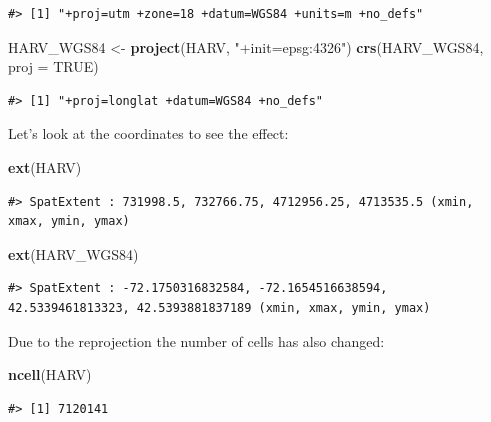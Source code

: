 \documentclass[
]{book}
\newenvironment{Shaded}{\begin{snugshade}}{\end{snugshade}}
\newcommand{\AttributeTok}[1]{\textcolor[rgb]{0.13,0.29,0.53}{#1}}
\newcommand{\ConstantTok}[1]{\textcolor[rgb]{0.56,0.35,0.01}{#1}}
\newcommand{\FunctionTok}[1]{\textcolor[rgb]{0.13,0.29,0.53}{\textbf{#1}}}
\newcommand{\NormalTok}[1]{#1}
\newcommand{\OtherTok}[1]{\textcolor[rgb]{0.56,0.35,0.01}{#1}}
\newcommand{\StringTok}[1]{\textcolor[rgb]{0.31,0.60,0.02}{#1}}
\begin{document}
\begin{verbatim}
#> [1] "+proj=utm +zone=18 +datum=WGS84 +units=m +no_defs"
\end{verbatim}

\begin{Shaded}
\begin{Highlighting}[]
\NormalTok{HARV\_WGS84 }\OtherTok{\textless{}{-}} \FunctionTok{project}\NormalTok{(HARV, }\StringTok{"+init=epsg:4326"}\NormalTok{)}
\FunctionTok{crs}\NormalTok{(HARV\_WGS84, }\AttributeTok{proj =} \ConstantTok{TRUE}\NormalTok{)}
\end{Highlighting}
\end{Shaded}

\begin{verbatim}
#> [1] "+proj=longlat +datum=WGS84 +no_defs"
\end{verbatim}

Let's look at the coordinates to see the effect:

\begin{Shaded}
\begin{Highlighting}[]
\FunctionTok{ext}\NormalTok{(HARV)}
\end{Highlighting}
\end{Shaded}

\begin{verbatim}
#> SpatExtent : 731998.5, 732766.75, 4712956.25, 4713535.5 (xmin, xmax, ymin, ymax)
\end{verbatim}

\begin{Shaded}
\begin{Highlighting}[]
\FunctionTok{ext}\NormalTok{(HARV\_WGS84)}
\end{Highlighting}
\end{Shaded}

\begin{verbatim}
#> SpatExtent : -72.1750316832584, -72.1654516638594, 42.5339461813323, 42.5393881837189 (xmin, xmax, ymin, ymax)
\end{verbatim}

Due to the reprojection the number of cells has also changed:

\begin{Shaded}
\begin{Highlighting}[]
\FunctionTok{ncell}\NormalTok{(HARV)}
\end{Highlighting}
\end{Shaded}

\begin{verbatim}
#> [1] 7120141
\end{verbatim}
\end{document}
